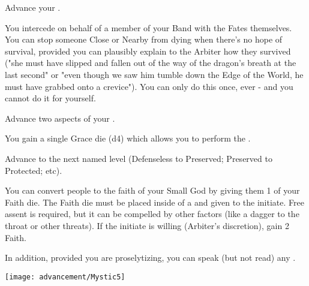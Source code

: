 \begin{multicols*}{2}
Advance your  \DCUP.  



You intercede on behalf of a member of your Band with the Fates themselves.  You can stop someone Close or Nearby from dying when there's no hope of survival, provided you can plausibly explain to the Arbiter how they survived ("she must have slipped and fallen out of the way of the dragon's breath at the last second" or "even though we saw him tumble down the Edge of the World, he must have grabbed onto a crevice").  You can only do this once, ever - and you cannot do it for yourself. 


Advance two  aspects of your  \DCUP.



You gain a single Grace die (d4) which allows you to perform the .


Advance   to the next named level (Defenseless to Preserved; Preserved to Protected; etc).


You can convert people to the faith of your Small God by giving them 1 of your Faith die.  The Faith die must be placed inside of a  and given to the initiate. Free assent is required, but it can be compelled by other factors (like a dagger to the throat or other threats). If the initiate is willing (Arbiter's discretion), gain 2 Faith.

In addition, provided you are proselytizing, you can speak (but not read) any .

\end{multicols*}

\newpage

\begin{center}
\texttt{[image: advancement/Mystic5]}
\end{center}

